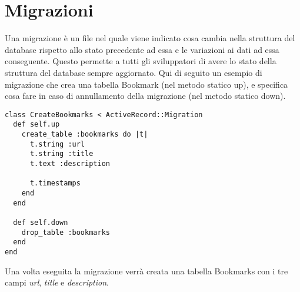 \section{Migrazioni}

 \label{App:AppendiceMigrazioni}
Una migrazione è un file nel quale viene indicato cosa cambia nella struttura del database rispetto allo stato precedente ad essa e le variazioni ai dati ad essa conseguente.  Questo permette a tutti gli sviluppatori di avere lo stato della struttura del database sempre aggiornato.
Qui di seguito un esempio di migrazione che crea una tabella Bookmark (nel metodo statico up), e specifica cosa fare in caso di annullamento della migrazione (nel metodo statico down).
\begin{lstlisting}
class CreateBookmarks < ActiveRecord::Migration
  def self.up
    create_table :bookmarks do |t|
      t.string :url
      t.string :title
      t.text :description
      
      t.timestamps
    end
  end

  def self.down
    drop_table :bookmarks
  end
end
\end{lstlisting}
Una volta eseguita la migrazione verrà creata una tabella Bookmarks con i tre campi \textit{url}, \textit{title} e \textit{description}.